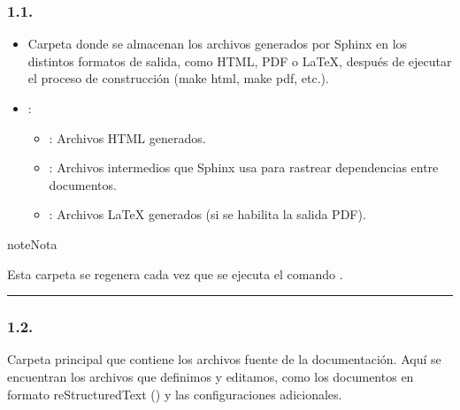 \documentclass[a4paper,10pt,spanish]{sphinxmanual}
\begin{document}
\subsubsection{1.1. }
\label{\detokenize{configuracion_inicial/004.estructura_inicial_proyecto:carpeta-build}}\begin{itemize}
\item {} 
\sphinxAtStartPar
Carpeta donde se almacenan los archivos generados por Sphinx en los distintos formatos de salida, como HTML, PDF o LaTeX, después de ejecutar el proceso de construcción (make html, make pdf, etc.).

\item {} 
\sphinxAtStartPar
{}:
\begin{itemize}
\item {} 
\sphinxAtStartPar
{}: Archivos HTML generados.

\item {} 
\sphinxAtStartPar
{}: Archivos intermedios que Sphinx usa para rastrear dependencias entre documentos.

\item {} 
\sphinxAtStartPar
{}: Archivos LaTeX generados (si se habilita la salida PDF).

\end{itemize}

\end{itemize}

\begin{sphinxadmonition}{note}{Nota}

\sphinxAtStartPar
Esta carpeta se regenera cada vez que se ejecuta el comando .
\end{sphinxadmonition}


\bigskip\hrule\bigskip



\subsubsection{1.2. }
\label{\detokenize{configuracion_inicial/004.estructura_inicial_proyecto:carpeta-source}}
\sphinxAtStartPar
Carpeta principal que contiene los archivos fuente de la documentación. Aquí se encuentran los archivos que definimos y editamos, como los documentos en formato reStructuredText () y las configuraciones adicionales.
\end{document}
